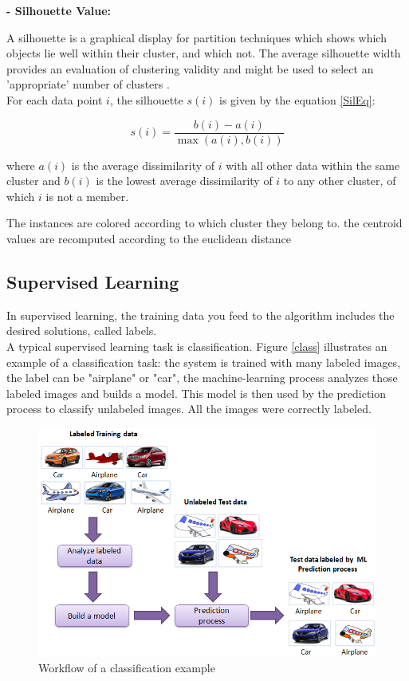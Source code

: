 			\textbf{- Silhouette Value:}
			
				A silhouette is a graphical display for partition techniques which shows  which objects lie  well within their cluster, and which not. The average silhouette width provides an evaluation  of clustering validity and might be used to select an 'appropriate' number of clusters \cite{a:silhouette}.\\
			 For each data point $i$, the silhouette $s(i)$ is given by the equation \ref{SilEq}:
				
				\begin{equation} 
					s(i)=\frac{b(i)-a(i)}{\max(a(i),b(i))} 
					\label{SilEq}
				\end{equation}
						
				where $a(i)$ is the average dissimilarity of $i$ with all other data within the same cluster and $b(i)$ is the lowest average dissimilarity of $i$ to any other cluster, of which $i$ is not a member.
						
						
						The instances are colored according to which cluster they belong to.
						the centroid values are recomputed according to the euclidean distance
\subsection{Supervised Learning}
In supervised learning, the training data you feed to the algorithm includes the desired
solutions, called labels.\\
A typical supervised learning task is classification.
Figure \ref{class} illustrates an example of a classification task: the system is trained with many labeled images, the label can be "airplane" or "car", the machine-learning process analyzes those labeled images and builds a model. This model is then used by the prediction process to classify unlabeled images. All the images were correctly labeled.
				\begin{figure}[h!]
					\centering
					\includegraphics[scale=0.7]{graphics/classification.PNG} 
					\caption{Workflow of a classification example} \label{ref} 
				\end{figure}


